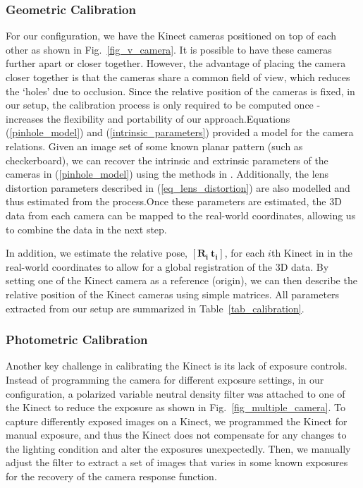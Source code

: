 \subsubsection{Geometric Calibration}For our configuration, we have the Kinect cameras 
positioned on top of each other as shown in Fig.~\ref{fig_v_camera}. It is possible to have these 
cameras further apart or closer together. However, the advantage of placing the camera closer 
together is that the cameras share a common field of view, which reduces the `holes' due to 
occlusion. Since the relative position of the cameras is fixed, in our setup, the calibration process is 
only required to be computed once -  increases the flexibility and portability of our 
approach.Equations (\ref{pinhole_model}) and (\ref{intrinsic_parameters}) provided a model for the 
camera relations. Given an image set of some known planar pattern (such as checkerboard), we 
can recover the intrinsic and extrinsic parameters of the cameras in (\ref{pinhole_model}) using the 
methods in \cite{zhang2000flexible}. Additionally, the lens distortion parameters described in 
(\ref{eq_lens_distortion}) are also modelled and thus estimated from the process.Once these 
parameters are estimated, the 3D data from each camera can be mapped to the real-world 
coordinates, allowing us to combine the data in the next step. 


In addition, we estimate the relative pose, $[\mathbf{R_{i}~ t_{i}}]$, for each $i$th Kinect in in the 
real-world coordinates to allow for a global registration of the 3D data. By setting one of the Kinect 
camera as a reference (origin), we can then describe the relative position of the Kinect cameras 
using simple matrices. All parameters extracted from our setup are summarized in 
Table~\ref{tab_calibration}.

\subsubsection{Photometric Calibration}Another key challenge in calibrating the Kinect is its lack of 
exposure controls. Instead of programming the camera for different exposure settings, in our 
configuration, a polarized variable neutral density filter was attached to one of the Kinect to reduce 
the exposure as shown in Fig.~\ref{fig_multiple_camera}. To capture differently exposed images on 
a Kinect, we programmed the Kinect for manual exposure, and thus the Kinect does not 
compensate for any changes to the lighting condition and alter the exposures unexpectedly.  Then, 
we manually adjust the filter to extract a set of images that varies in some known exposures for the 
recovery of the camera response function\cite{mannist}.

